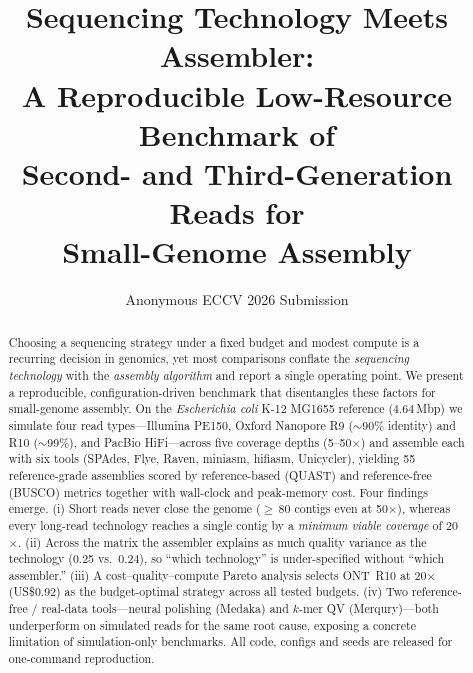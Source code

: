 \documentclass[runningheads]{llncs}
\begin{document}
\title{Sequencing Technology Meets Assembler:\\ A Reproducible Low-Resource Benchmark of\\ Second- and Third-Generation Reads for\\ Small-Genome Assembly}


\author{Anonymous ECCV 2026 Submission}

\maketitle

\begin{abstract}
Choosing a sequencing strategy under a fixed budget and modest compute
is a recurring decision in genomics, yet most comparisons conflate the
\emph{sequencing technology} with the \emph{assembly algorithm} and report
a single operating point. We present a reproducible, configuration-driven
benchmark that disentangles these factors for small-genome assembly. On the
\emph{Escherichia coli} K-12 MG1655 reference (4.64\,Mbp) we simulate four
read types---Illumina PE150, Oxford Nanopore R9 ($\sim$90\% identity) and
R10 ($\sim$99\%), and PacBio HiFi---across five coverage depths
(5--50$\times$) and assemble each with six tools (SPAdes, Flye, Raven,
miniasm, hifiasm, Unicycler), yielding 55 reference-grade assemblies scored
by reference-based (QUAST) and reference-free (BUSCO) metrics together with
wall-clock and peak-memory cost. Four findings emerge. (i) Short reads never
close the genome ($\geq$\,80 contigs even at 50$\times$), whereas every
long-read technology reaches a single contig by a \emph{minimum viable
coverage} of 20$\times$. (ii) Across the matrix the assembler explains as
much quality variance as the technology (0.25 vs.\ 0.24), so ``which
technology'' is under-specified without ``which assembler.'' (iii) A
cost--quality--compute Pareto analysis selects ONT~R10 at 20$\times$
(US\$0.92) as the budget-optimal strategy across all tested budgets.
(iv) Two reference-free / real-data tools---neural polishing (Medaka) and
$k$-mer QV (Merqury)---both underperform on simulated reads for the same
root cause, exposing a concrete limitation of simulation-only benchmarks.
All code, configs and seeds are released for one-command reproduction.
\end{abstract}
\end{document}
